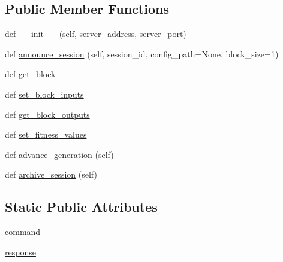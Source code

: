 \subsection*{Public Member Functions}
\begin{DoxyCompactItemize}
\item 
def \hyperlink{classNEAT__PyGenetics_1_1NEAT_1_1Networking_1_1Client_1_1SimulationClient_1_1SimulationClient_a1c778ac890847ec7cf4f2dedab962ce9}{\+\_\+\+\_\+init\+\_\+\+\_\+} (self, server\+\_\+address, server\+\_\+port)
\item 
def \hyperlink{classNEAT__PyGenetics_1_1NEAT_1_1Networking_1_1Client_1_1SimulationClient_1_1SimulationClient_a32f0a2edf3339e2d874bca161516ac18}{announce\+\_\+session} (self, session\+\_\+id, config\+\_\+path=None, block\+\_\+size=1)
\item 
def \hyperlink{classNEAT__PyGenetics_1_1NEAT_1_1Networking_1_1Client_1_1SimulationClient_1_1SimulationClient_ad77ac994b568f19bb7468ebff9332cbc}{get\+\_\+block}
\item 
def \hyperlink{classNEAT__PyGenetics_1_1NEAT_1_1Networking_1_1Client_1_1SimulationClient_1_1SimulationClient_a6cb78ce85e0d06b14c4da1235ca554b0}{set\+\_\+block\+\_\+inputs}
\item 
def \hyperlink{classNEAT__PyGenetics_1_1NEAT_1_1Networking_1_1Client_1_1SimulationClient_1_1SimulationClient_a9d5c043ac1439872cfcbb767e751d586}{get\+\_\+block\+\_\+outputs}
\item 
def \hyperlink{classNEAT__PyGenetics_1_1NEAT_1_1Networking_1_1Client_1_1SimulationClient_1_1SimulationClient_a30dca9ecfedc51b314579100f8fa21d4}{set\+\_\+fitness\+\_\+values}
\item 
def \hyperlink{classNEAT__PyGenetics_1_1NEAT_1_1Networking_1_1Client_1_1SimulationClient_1_1SimulationClient_a8aa37dad9f6092178fd4b08e654829ca}{advance\+\_\+generation} (self)
\item 
def \hyperlink{classNEAT__PyGenetics_1_1NEAT_1_1Networking_1_1Client_1_1SimulationClient_1_1SimulationClient_a2b90544554ffa9c9d884f68c9e4ec01b}{archive\+\_\+session} (self)
\end{DoxyCompactItemize}
\subsection*{Static Public Attributes}
\begin{DoxyCompactItemize}
\item 
\hyperlink{classNEAT__PyGenetics_1_1NEAT_1_1Networking_1_1Client_1_1SimulationClient_1_1SimulationClient_ae492ae862d9d7a5096f16051c4b43cb0}{command}
\item 
\hyperlink{classNEAT__PyGenetics_1_1NEAT_1_1Networking_1_1Client_1_1SimulationClient_1_1SimulationClient_a6a2ac9e9e4603999962e160328eaffce}{response}
\end{DoxyCompactItemize}


